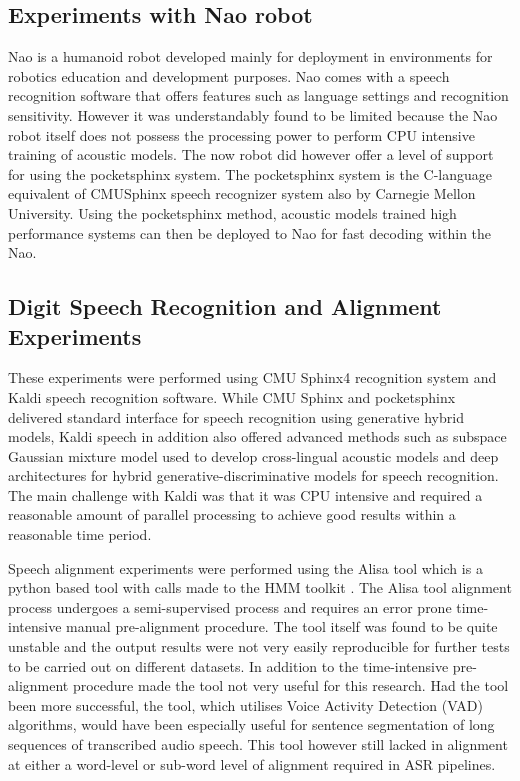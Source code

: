 \subsection{Experiments with Nao robot}
Nao is a humanoid robot developed mainly for deployment in environments for robotics education and development purposes.  Nao comes with a speech recognition software that offers features such as language settings and recognition sensitivity.  However it was understandably found to be limited because the Nao robot itself does not possess the processing power to perform CPU intensive training of acoustic models.  The now robot did however offer a level of support for using the pocketsphinx system. The pocketsphinx system is the C-language equivalent of CMUSphinx speech recognizer system also by Carnegie Mellon University.  Using the pocketsphinx method, acoustic models trained high performance systems can then be deployed to Nao for fast decoding within the Nao.  

\subsection{Digit Speech Recognition and Alignment Experiments}\label{sec_digitspeech}
These experiments were performed using CMU Sphinx4 recognition system and Kaldi speech recognition software.  While CMU Sphinx and pocketsphinx delivered standard interface for speech recognition using generative hybrid models, Kaldi speech in addition also offered advanced methods such as subspace Gaussian mixture model used to develop cross-lingual acoustic models and deep architectures for hybrid generative-discriminative models for speech recognition.   The main challenge with Kaldi was that it was CPU intensive and required a reasonable amount of parallel processing to achieve good results within a reasonable time period. 

Speech alignment experiments were performed using the Alisa \cite{stan2016alisa} tool which is a python based tool with calls made to the HMM toolkit \cite{young2002htk}.  The Alisa tool alignment process undergoes a semi-supervised process and requires an error prone time-intensive manual pre-alignment procedure.  The tool itself was found to be quite unstable and the output results were not very easily reproducible for further tests to be carried out on different datasets.  In addition to the time-intensive pre-alignment procedure made the tool not very useful for this research. Had the tool been more successful, the tool, which utilises Voice Activity Detection (VAD) algorithms, would have been especially useful for sentence segmentation of long sequences of transcribed audio speech.  This tool however still lacked in alignment at either a word-level or sub-word level of alignment required in ASR pipelines.


